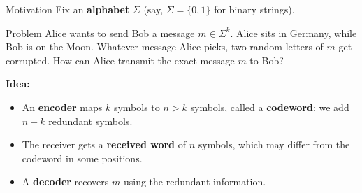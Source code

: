 \documentclass{zkdl-presentation-template}
\begin{document}
    \begin{frame}{Motivation}
        Fix an \textbf{alphabet} $\Sigma$ (say, $\Sigma = \{0,1\}$ for binary strings).

        \begin{alertblock}{Problem}
            Alice wants to send Bob a message $m \in \Sigma^k$. Alice sits in Germany, while Bob is on the Moon. Whatever message Alice picks, two random letters of $m$ get corrupted. How can Alice transmit the exact message $m$ to Bob?
        \end{alertblock}
        \pause

        \textbf{Idea:}
        \begin{itemize}
            \item An \textbf{encoder} maps $k$ symbols to $n > k$ symbols, called a \textbf{codeword}: we add $n-k$ redundant symbols.\pause
            \item The receiver gets a \textbf{received word} of $n$ symbols, which may differ from the codeword in some positions.\pause
            \item A \textbf{decoder} recovers $m$ using the redundant information.
        \end{itemize}
    \end{frame}
\end{document}

